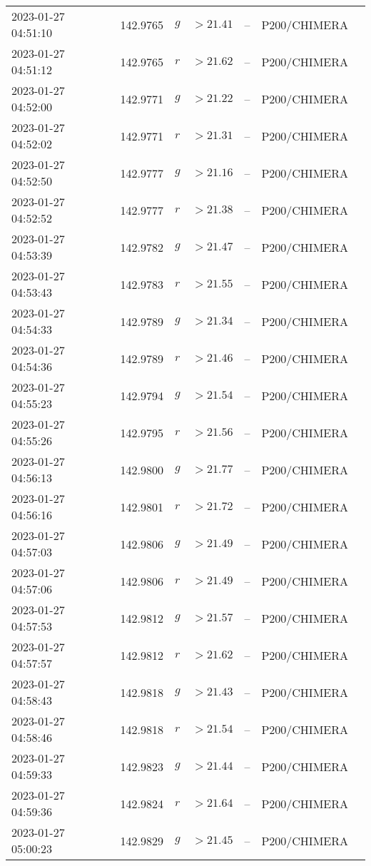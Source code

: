 \documentclass{nature_plusfigure}
\begin{document}
\begin{supplement}
\begin{center}
\begin{longtable}{lllllll}
2023-01-27 04:51:10 & 142.9765 & $g$ & $>21.41$ & -- & P200/CHIMERA &  \\ 
2023-01-27 04:51:12 & 142.9765 & $r$ & $>21.62$ & -- & P200/CHIMERA &  \\ 
2023-01-27 04:52:00 & 142.9771 & $g$ & $>21.22$ & -- & P200/CHIMERA &  \\ 
2023-01-27 04:52:02 & 142.9771 & $r$ & $>21.31$ & -- & P200/CHIMERA &  \\ 
2023-01-27 04:52:50 & 142.9777 & $g$ & $>21.16$ & -- & P200/CHIMERA &  \\ 
2023-01-27 04:52:52 & 142.9777 & $r$ & $>21.38$ & -- & P200/CHIMERA &  \\ 
2023-01-27 04:53:39 & 142.9782 & $g$ & $>21.47$ & -- & P200/CHIMERA &  \\ 
2023-01-27 04:53:43 & 142.9783 & $r$ & $>21.55$ & -- & P200/CHIMERA &  \\ 
2023-01-27 04:54:33 & 142.9789 & $g$ & $>21.34$ & -- & P200/CHIMERA &  \\ 
2023-01-27 04:54:36 & 142.9789 & $r$ & $>21.46$ & -- & P200/CHIMERA &  \\ 
2023-01-27 04:55:23 & 142.9794 & $g$ & $>21.54$ & -- & P200/CHIMERA &  \\ 
2023-01-27 04:55:26 & 142.9795 & $r$ & $>21.56$ & -- & P200/CHIMERA &  \\ 
2023-01-27 04:56:13 & 142.9800 & $g$ & $>21.77$ & -- & P200/CHIMERA &  \\ 
2023-01-27 04:56:16 & 142.9801 & $r$ & $>21.72$ & -- & P200/CHIMERA &  \\ 
2023-01-27 04:57:03 & 142.9806 & $g$ & $>21.49$ & -- & P200/CHIMERA &  \\ 
2023-01-27 04:57:06 & 142.9806 & $r$ & $>21.49$ & -- & P200/CHIMERA &  \\ 
2023-01-27 04:57:53 & 142.9812 & $g$ & $>21.57$ & -- & P200/CHIMERA &  \\ 
2023-01-27 04:57:57 & 142.9812 & $r$ & $>21.62$ & -- & P200/CHIMERA &  \\ 
2023-01-27 04:58:43 & 142.9818 & $g$ & $>21.43$ & -- & P200/CHIMERA &  \\ 
2023-01-27 04:58:46 & 142.9818 & $r$ & $>21.54$ & -- & P200/CHIMERA &  \\ 
2023-01-27 04:59:33 & 142.9823 & $g$ & $>21.44$ & -- & P200/CHIMERA &  \\ 
2023-01-27 04:59:36 & 142.9824 & $r$ & $>21.64$ & -- & P200/CHIMERA &  \\ 
2023-01-27 05:00:23 & 142.9829 & $g$ & $>21.45$ & -- & P200/CHIMERA &  \\ 

\end{longtable}
\end{center}
\end{supplement}
\end{document}
